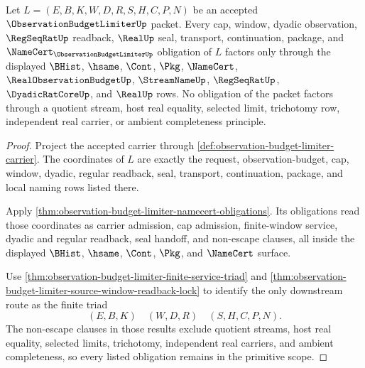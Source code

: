 \begin{theorem}
\label{thm:observation-budget-limiter-primitive-scope}
Let $L=(E,B,K,W,D,R,S,H,C,P,N)$ be an accepted $\ObservationBudgetLimiterUp$ packet. Every cap, window, dyadic observation, $\RegSeqRatUp$ readback, $\RealUp$ seal, transport, continuation, package, and $\NameCert_{\ObservationBudgetLimiterUp}$ obligation of $L$ factors only through the displayed $\BHist$, $\hsame$, $\Cont$, $\Pkg$, $\NameCert$, $\RealObservationBudgetUp$, $\StreamNameUp$, $\RegSeqRatUp$, $\DyadicRatCoreUp$, and $\RealUp$ rows. No obligation of the packet factors through a quotient stream, host real equality, selected limit, trichotomy row, independent real carrier, or ambient completeness principle.
\end{theorem}
\begin{proof}
Project the accepted carrier through \autoref{def:observation-budget-limiter-carrier}. The coordinates of $L$ are exactly the request, observation-budget, cap, window, dyadic, regular readback, seal, transport, continuation, package, and local naming rows listed there.

Apply \autoref{thm:observation-budget-limiter-namecert-obligations}. Its obligations read those coordinates as carrier admission, cap admission, finite-window service, dyadic and regular readback, seal handoff, and non-escape clauses, all inside the displayed $\BHist$, $\hsame$, $\Cont$, $\Pkg$, and $\NameCert$ surface.

Use \autoref{thm:observation-budget-limiter-finite-service-triad} and \autoref{thm:observation-budget-limiter-source-window-readback-lock} to identify the only downstream route as the finite triad
$$
(E,B,K) \quad (W,D,R) \quad (S,H,C,P,N).
$$
The non-escape clauses in those results exclude quotient streams, host real equality, selected limits, trichotomy, independent real carriers, and ambient completeness, so every listed obligation remains in the primitive scope.
\end{proof}

